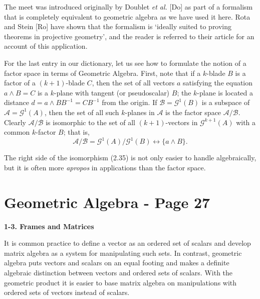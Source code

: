 \documentclass[fleqn]{scrartcl}
\numberwithin{equation}{section}
\begin{document}
\vspace{1em}
\noindent The meet was introduced originally by Doublet \textit{et al.} [Do] as part of a formalism that is completely equivalent to geometric algebra as we have used it here. Rota and Stein [Ro] have shown that the formalism is `ideally suited to proving theorems in projective geometry', and the reader is referred to their article for an account of this application.

\vspace{1em}
\noindent For the last entry in our dictionary, let us see how to formulate the notion of a factor space in terms of Geometric Algebra. First, note that if a \(k\)-blade \(B\) is a factor of a \((k+1)\)-blade \(C\), then the set of all vectors \(a\) satisfying the equation \(a \wedge B = C\) is a \(k\)-plane with tangent (or pseudoscalar) \(B\); the \(k\)-plane is located a distance \(d = a \wedge BB^{-1} = CB^{-1}\) from the origin. If \(\mathscr{B} = \mathscr{G}^1(B)\) is a subspace of \(\mathscr{A} = \mathscr{G}^1(A)\), then the set of all such \(k\)-planes in \(\mathscr{A}\) is the factor space \(\mathscr{A}/\mathscr{B}\). Clearly \(\mathscr{A}/\mathscr{B}\) is isomorphic to the set of all \((k+1)\)-vectors in \(\mathscr{G}^{k+1}(A)\) with a common \(k\)-factor \(B\); that is,
\begin{equation}
\mathscr{A}/\mathscr{B} = \mathscr{G}^1(A)/\mathscr{G}^1(B) \leftrightarrow \{a \wedge B\}. \tag{2.35}
\end{equation}

\noindent The right side of the isomorphism (2.35) is not only easier to handle algebraically, but it is often more \textit{apropos} in applications than the factor space.

\section*{Geometric Algebra - Page 27}

\noindent\textbf{1-3. Frames and Matrices}

\vspace{1em}
\noindent It is common practice to define a vector as an ordered set of scalars and develop matrix algebra as a system for manipulating such sets. In contrast, geometric algebra puts vectors and scalars on an equal footing and makes a definite algebraic distinction between vectors and ordered sets of scalars. With the geometric product it is easier to base matrix algebra on manipulations with ordered sets of vectors instead of scalars.
\end{document}
